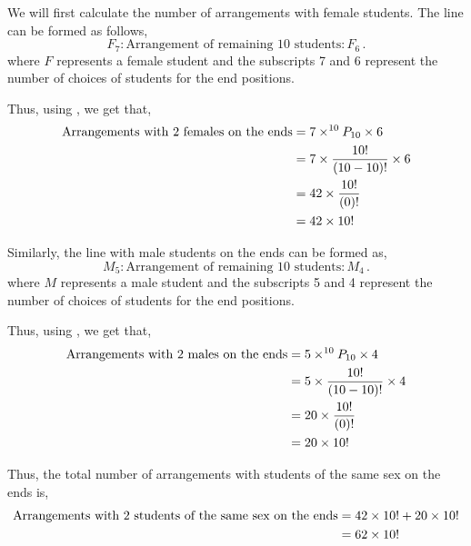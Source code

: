 \begin{subquestions}
\begin{subsubquestions}

\subsubquestion

We will first calculate the number of arrangements with female students. The line can be formed as follows,
\begin{equation}
	F_7 : \text{Arrangement of remaining 10 students} : F_6 \,.
\end{equation}
where $F$ represents a female student and the subscripts 7 and 6 represent the number of choices of students for the end positions.

Thus, using , we get that,
\begin{align}
	\text{Arrangements with 2 females on the ends} & = 7 \times ^{10}P_{10} \times 6 \nonumber \\
	                                          & = 7 \times \frac{10!}{(10-10)!} \times 6 \nonumber \\
	                                          & = 42 \times \frac{10!}{(0)!} \nonumber \\
	                                          & = 42 \times 10! 
\end{align}

Similarly, the line with male students on the ends can be formed as,
\begin{equation}
	M_5 : \text{Arrangement of remaining 10 students} : M_4 \,.
\end{equation}
where $M$ represents a male student and the subscripts 5 and 4 represent the number of choices of students for the end positions.

Thus, using , we get that,
\begin{align}
	\text{Arrangements with 2 males on the ends} & = 5 \times ^{10}P_{10} \times 4 \nonumber \\
	& = 5 \times \frac{10!}{(10-10)!} \times 4 \nonumber \\
	& = 20 \times \frac{10!}{(0)!} \nonumber \\
	& = 20 \times 10! 
\end{align}

Thus, the total number of arrangements with students of the same sex on the ends is,
\begin{align}
	\text{Arrangements with 2 students of the same sex on the ends} & = 42 \times 10! + 20 \times 10! \nonumber \\
	                                                & = 62 \times 10! 
\end{align}


\end{subsubquestions}
\end{subquestions}
